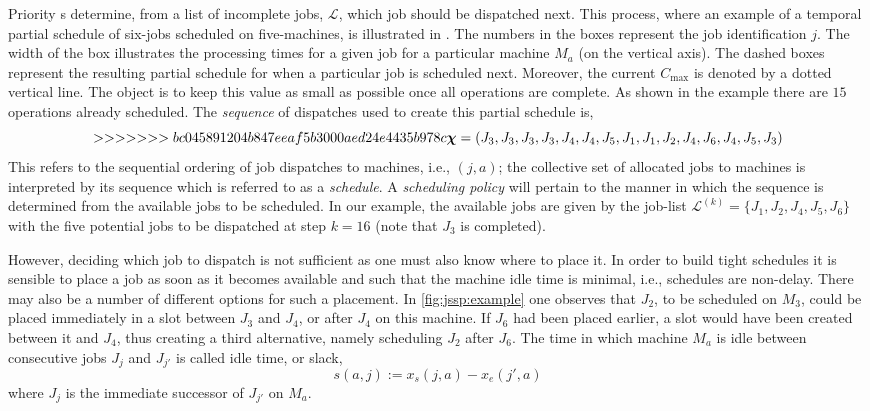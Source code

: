 \documentclass[smallextended]{svjour3}
\begin{document}
Priority \dr s determine, from a list of incomplete jobs, 
$\mathcal{L}$, which job should be dispatched next. This process, where an example of 
a temporal partial schedule of six-jobs scheduled on five-machines, is illustrated in  .
The numbers in the boxes represent the job identification $j$. 
The width of the box illustrates the processing times for a given job for a 
particular machine $M_a$ (on the vertical axis). 
The dashed boxes represent the resulting partial schedule for when a particular 
job is scheduled next. 
Moreover, the current $C_{\max}$ is denoted by a dotted vertical line. 
The object is to keep this value as small as possible once all operations are 
complete. As shown in the example there are $15$ operations already scheduled. 
The \textit{sequence} of dispatches used to create this partial schedule is,
\begin{equation}

>>>>>>> bc045891204b847eeaf5b3000aed24e4435b978c

	\vchi=\left(J_3,J_3,J_3,J_3,J_4,J_4,J_5,J_1,J_1,J_2,J_4,J_6,J_4,J_5,J_3\right)
	\end{equation}
	This refers to the sequential ordering of job dispatches to machines, i.e., $(j,a)$; 
	the collective set of allocated jobs to machines is interpreted by its 
	sequence which is referred to as a \emph{schedule}.
	A \emph{scheduling policy} will pertain to the manner in which 
	the sequence is determined from the available jobs to be scheduled. 
	In our example, the available jobs are given by the job-list
	$\mathcal{L}^{(k)}=\{J_1,J_2,J_4,J_5,J_6\}$ with the five potential jobs 
	to be dispatched at step $k=16$ (note that $J_3$ is completed).
	
	However, deciding which job to dispatch is not sufficient as one must also know 
	where to place it. In order to build tight schedules it is sensible to place a 
	job as soon as it becomes available and such that the machine idle time is 
	minimal, i.e., schedules are non-delay. 
	There may also be a number of different options for such a placement. 
	In \cref{fig:jssp:example} one observes that $J_2$, to be scheduled on $M_3$, 
	could be placed immediately in a slot between $J_3$ and $J_4$, or after $J_4$ 
	on this machine. 
	If $J_6$ had been placed earlier, a slot would have been created between it and 
	$J_4$, thus creating a third alternative, namely scheduling $J_2$ after $J_6$. 
	The time in which machine $M_a$ is idle between consecutive jobs $J_j$ and 
	$J_{j'}$ is called idle time, or slack, 
	\begin{equation} 
	s(a,j):=x_s(j,a)-x_e(j',a) \label{eq:slack}
	\end{equation}
	where $J_j$ is the immediate successor of $J_{j'}$ on $M_a$. 
	
\end{document}
